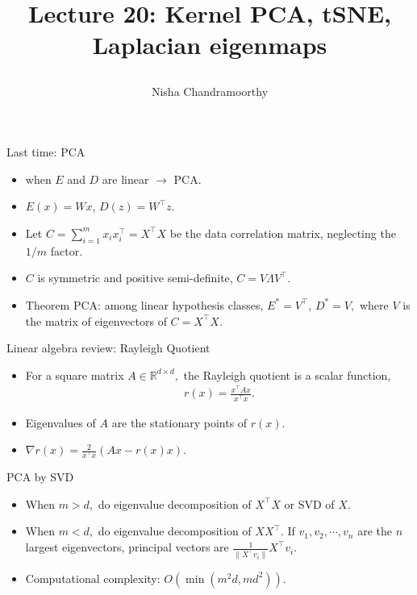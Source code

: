 \documentclass[final]{beamer}
\title{\begin{huge}{Lecture 20: Kernel PCA, tSNE, Laplacian eigenmaps}\end{huge}} %
\author{Nisha Chandramoorthy} %
\begin{document}
\frame{\titlepage}

\begin{frame}{Last time: PCA}
	\begin{itemize}
	\item when $E$ and $D$ are linear $\to$ PCA.
	\pause 
	\item $E(x) = Wx$, $D(z) = W^\top z$.
	\pause
\item Let $C = \sum_{i=1}^m x_i x_i^\top = X^\top X$ be the data correlation matrix, neglecting the $1/m$ factor.
	\pause 
	\item $C$ is symmetric and positive semi-definite, $C = V \Lambda V^\top$.
	\item Theorem PCA: among linear hypothesis classes, $E^* = V^\top$, $D^* = V,$ where $V$ is the matrix of eigenvectors of $C = X^\top X$.
	\end{itemize}
\end{frame}
\begin{frame}{Linear algebra review: Rayleigh Quotient}
\begin{itemize}
	\item For a square matrix $A \in \mathbb{R}^{d\times d},$ the Rayleigh quotient is a scalar function,
	\begin{align*}
		r(x) = \frac{x^\top A x}{x^\top x}.
	\end{align*}
	\pause
	\item Eigenvalues of $A$ are the stationary points of $r(x)$.
	\pause
	\item $\nabla r(x) = \frac{2}{x^\top x} (Ax - r(x)x)$.
\end{itemize}
\end{frame}
\begin{frame}{PCA by SVD}
	\begin{itemize}
		\item When $m > d,$ do eigenvalue decomposition of $X^\top X$ or SVD of $X$.
		\pause
		\item When $m < d,$ do eigenvalue decomposition of $XX^\top.$ If $v_1, v_2,\cdots, v_n$ are the $n$ largest eigenvectors, principal vectors are $\frac{1}{\|X^\top v_i\|} X^\top v_i$.
		\pause
		\item Computational complexity: $O(\min(m^2d, md^2))$.

	\end{itemize}

\end{frame}
\end{document}
